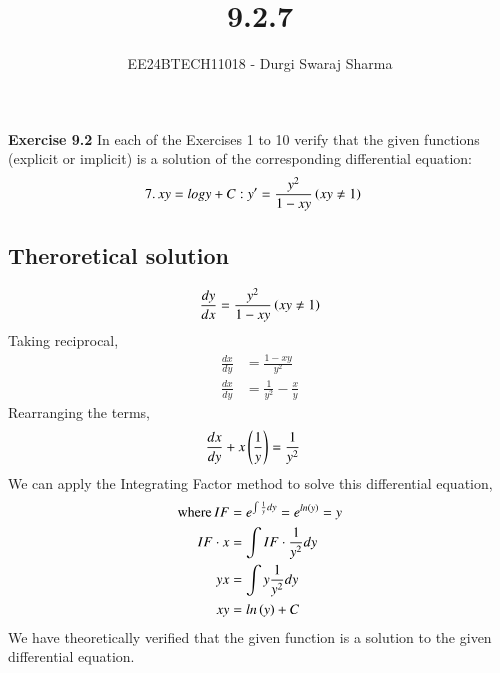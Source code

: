\documentclass[journal]{IEEEtran}
\begin{document}

\vspace{3cm}

\title{9.2.7}
\author{EE24BTECH11018 - Durgi Swaraj Sharma}
{\let\newpage\relax\maketitle}
\renewcommand{\thefigure}{\theenumi}
\renewcommand{\thetable}{\theenumi}

\textbf{Exercise 9.2} In each of the Exercises 1 to 10 verify that the given functions (explicit or implicit) is a solution of the corresponding differential equation:
\begin{align}
	7.\, xy = log y + C &: y^{\prime} = \frac{y^2}{1 - xy} \left(xy \neq 1\right)
\end{align}
\subsection*{Theroretical solution}
\begin{align}
	\frac{dy}{dx} = \frac{y^2}{1 - xy} \left(xy \neq 1\right)
\end{align}
Taking reciprocal,
\begin{align}
	\frac{dx}{dy} &= \frac{1 - xy}{y^2}\\
	\frac{dx}{dy} &= \frac{1}{y^2} - \frac{x}{y}
\end{align}
Rearranging the terms,
\begin{align}
	\frac{dx}{dy} + x\left(\frac{1}{y}\right) &= \frac{1}{y^2}
\end{align}
We can apply the Integrating Factor method to solve this differential equation, 
\begin{align}
	\text{where}\, IF &= e^{\int{\frac{1}{y}dy}} = e^{ln\left(y\right)} = y\\
	IF \cdot x &= \int{IF\cdot \frac{1}{y^2} } dy\\
	yx &= \int{y \frac{1}{y^2} }dy\\
	xy &= ln\left(y\right) + C
\end{align}
We have theoretically verified that the given function is a solution to the given differential equation.
\end{document}
